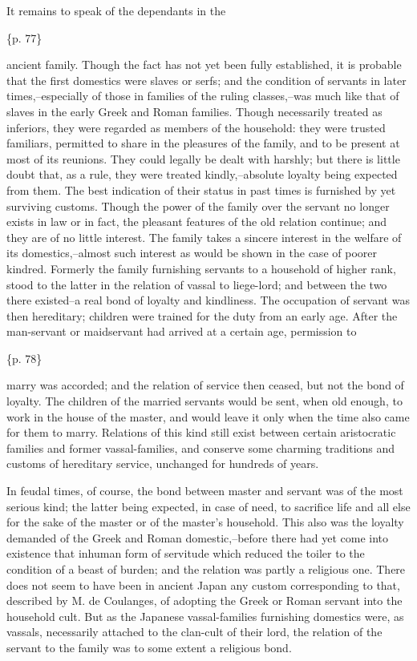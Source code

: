 It remains to speak of the dependants in the

\{p. 77\}

ancient family. Though the fact has not yet been fully established, it is probable that the first domestics were slaves or serfs; and the condition of servants in later times,--especially of those in families of the ruling classes,--was much like that of slaves in the early Greek and Roman families. Though necessarily treated as inferiors, they were regarded as members of the household: they were trusted familiars, permitted to share in the pleasures of the family, and to be present at most of its reunions. They could legally be dealt with harshly; but there is little doubt that, as a rule, they were treated kindly,--absolute loyalty being expected from them. The best indication of their status in past times is furnished by yet surviving customs. Though the power of the family over the servant no longer exists in law or in fact, the pleasant features of the old relation continue; and they are of no little interest. The family takes a sincere interest in the welfare of its domestics,--almost such interest as would be shown in the case of poorer kindred. Formerly the family furnishing servants to a household of higher rank, stood to the latter in the relation of vassal to liege-lord; and between the two there existed--a real bond of loyalty and kindliness. The occupation of servant was then hereditary; children were trained for the duty from an early age. After the man-servant or maidservant had arrived at a certain age, permission to

\{p. 78\}

marry was accorded; and the relation of service then ceased, but not the bond of loyalty. The children of the married servants would be sent, when old enough, to work in the house of the master, and would leave it only when the time also came for them to marry. Relations of this kind still exist between certain aristocratic families and former vassal-families, and conserve some charming traditions and customs of hereditary service, unchanged for hundreds of years.

In feudal times, of course, the bond between master and servant was of the most serious kind; the latter being expected, in case of need, to sacrifice life and all else for the sake of the master or of the master's household. This also was the loyalty demanded of the Greek and Roman domestic,--before there had yet come into existence that inhuman form of servitude which reduced the toiler to the condition of a beast of burden; and the relation was partly a religious one. There does not seem to have been in ancient Japan any custom corresponding to that, described by M. de Coulanges, of adopting the Greek or Roman servant into the household cult. But as the Japanese vassal-families furnishing domestics were, as vassals, necessarily attached to the clan-cult of their lord, the relation of the servant to the family was to some extent a religious bond.

